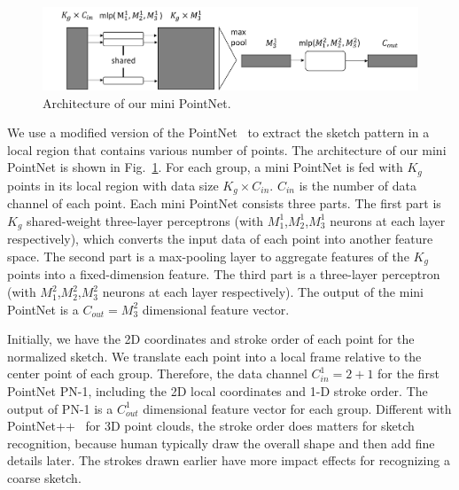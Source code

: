 \begin{figure}
	\centering
	\includegraphics[width=\columnwidth]{images/pointnet.png}
	\caption{Architecture of our mini PointNet.}
	\label{fig:miniPN}
\end{figure}

\vspace{0.1cm}
%
We use a modified version of the PointNet~\cite{qi2017pointnet} to extract the sketch pattern in a local region that contains various number of points.
The architecture of our mini PointNet is shown in Fig.~\ref{fig:miniPN}.
%
%
For each group, a mini PointNet is fed with $K_g$ points in its local region with data size $K_g \times C_{in}$.
$C_{in}$ is the number of data channel of each point.
Each mini PointNet consists three parts.
The first part is $K_g$ shared-weight three-layer perceptrons (with $M^{1}_1$,$M^{1}_2$,$M^{1}_3$ neurons at each layer respectively), which converts the input data of each point into another feature space.
%
The second part is a max-pooling layer to aggregate features of the $K_g$ points into a fixed-dimension feature.
%
The third part is a three-layer perceptron (with $M^{2}_1$,$M^{2}_2$,$M^{2}_3$ neurons at each layer respectively).
%
The output of the mini PointNet is a $C_{out}=M^{2}_3$ dimensional feature vector.


Initially, we have the 2{D} coordinates and stroke order of each point for the normalized sketch.
We translate each point into a local frame relative to the center point of each group.
Therefore, the data channel $C^1_{in}=2+1$ for the first PointNet PN-1, including the 2D local coordinates and 1-D stroke order.
The output of PN-1 is a $C^1_{out}$ dimensional feature vector for each group.
%
Different with PointNet++~\cite{qi2017pointnetplusplus} for 3D point clouds, the stroke order does matters for sketch recognition, because human typically draw the overall shape and then add fine details later.
%
The strokes drawn earlier have more impact effects for recognizing a coarse sketch.
%

